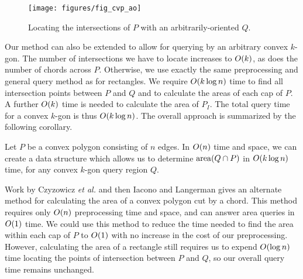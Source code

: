 \begin{figure}[t]
\begin{center}
  \texttt{[image: figures/fig\_cvp\_ao]}
  \caption{Locating the intersections of $P$ with an arbitrarily-oriented $Q$.}
  \label{fig:convexp:ao}
\end{center}
\end{figure}

Our method can also be extended to allow for querying by an arbitrary convex $k$-gon.
The number of intersections we have to locate increases to $O\!\left(k\right)$, as does the number of chords across $P$.
Otherwise, we use exactly the same preprocessing and general query method as for rectangles. 
We require $O\!\left(k \log{n}\right)$ time to find all intersection points between $P$ and $Q$ and to calculate the areas of each cap of $P$. 
A further $O\!\left(k\right)$ time is needed to calculate the area of $P_I$. 
The total query time for a convex $k$-gon is thus $O\!\left(k \log{n}\right)$.
The overall approach is summarized by the following corollary.

\begin{corollary}
\label{cor:convexp:karea}
Let $P$ be a convex polygon consisting of $n$ edges. In $O\!\left(n\right)$ time and space, we can create a data structure which allows us to determine $\operatorname{area}\!\left(Q \cap P\right)$ in $O\!\left(k \log{n}\right)$ time, for any convex $k$-gon query region $Q$.
\end{corollary}

Work by Czyzowicz \textit{et al.}\cite{DBLP:conf/cccg/CzyzowiczCU98} and then Iacono and Langerman\cite{IaconoL00} gives an alternate method for calculating the area of a convex polygon cut by a chord.
This method requires only $O\!\left(n\right)$ preprocessing time and space, and can answer area queries in $O\!\left(1\right)$ time.
We could use this method to reduce the time needed to find the area within each cap of $P$ to $O\!\left(1\right)$ with no increase in the cost of our preprocessing.
However, calculating the area of a rectangle still requires us to expend $O\!\left(\log{n}\right)$ time locating the points of intersection between $P$ and $Q$, so our overall query time remains unchanged.
